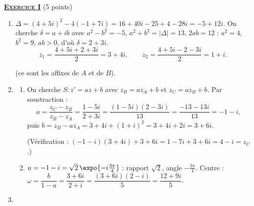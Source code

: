 \providecommand{\Plan}{(\mathscr{P})}
\providecommand{\Ouv}{(O ; \vec{u} , \vec{v})}
\providecommand{\Courbe}{(\mathscr{C})}
\providecommand{\CourbeP}{(\mathscr{C}')}
\providecommand{\cm}{~\mathrm{cm}}
\providecommand{\dx}{~\mathrm{d}x}
%
\noindent \underline{\textsc{\textbf{Exercice I}}} (5 points)
\begin{enumerate}
   \item {}
      $\Delta = (4 + 5i)^2 - 4(-1 + 7i) = 16 + 40i - 25 + 4 - 28i = -5 + 12i$.
      On cherche $\delta = a + ib$ avec $a^2 - b^2 = -5$, $a^2 + b^2 = |\Delta| = 13$, $2ab = 12$ :
      $a^2 = 4$, $b^2 = 9$, $ab > 0$, d'o\`u $\delta = 2 + 3i$.
      \[
         z_1 = \frac{4 + 5i + 2 + 3i}{2} = 3 + 4i, \qquad z_2 = \frac{4 + 5i - 2 - 3i}{2} = 1 + i.
      \]
      \par\noindent{} (ce sont les affixes de $A$ et de $B$).
   \item
      \begin{enumerate}
         \item {}
            On cherche $S : z' = az + b$ avec $z_B = a z_A + b$ et $z_C = a z_B + b$. Par soustraction :
            \[
               a = \frac{z_C - z_B}{z_B - z_A} = \frac{1 - 5i}{2 + 3i} = \frac{(1 - 5i)(2 - 3i)}{13} = \frac{-13 - 13i}{13} = -1 - i,
            \]
            puis $b = z_B - a z_A = 3 + 4i + (1 + i)^2 = 3 + 4i + 2i = 3 + 6i$.
            \par\noindent{}
            (V\'erification : $(-1-i)(3+4i) + 3 + 6i = 1 - 7i + 3 + 6i = 4 - i = z_C$.)
         \item {}
            $a = -1 - i = \sqrt{2}\,\expo{-i\frac{3\pi}{4}}$ : rapport $\sqrt{2}$, angle $-\frac{3\pi}{4}$.
            Centre : $\omega = \dfrac{b}{1 - a} = \dfrac{3 + 6i}{2 + i} = \dfrac{(3 + 6i)(2 - i)}{5} = \dfrac{12 + 9i}{5}$.
            \par\noindent{}
      \end{enumerate}
   \item
      \begin{enumerate}

\end{enumerate}
\end{enumerate}
